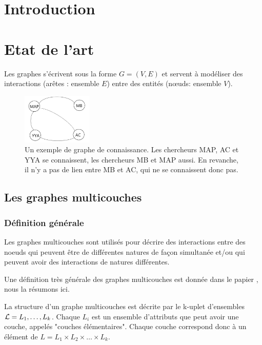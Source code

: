\documentclass[11pt,a4paper]{article}
\theoremstyle{definition}
\theoremstyle{remark}
\theoremstyle{remark}
\begin{document}
\newpage 

\tableofcontents
\newpage



\section*{Introduction}

\section{Etat de l'art}
\indent

Les graphes s'écrivent sous la forme $G=(V,E)$ et servent à modéliser des interactions (arêtes : ensemble $E$) entre des entités (nœuds: ensemble $V$). 

\begin{figure}[H]
	\centering
	\includegraphics[width=0.3\textwidth]{exGraphe.JPG}
	\caption{Un exemple de graphe de connaissance. Les chercheurs MAP, AC et YYA se connaissent, les chercheurs MB et MAP aussi. En revanche, il n'y a pas de lien entre MB et AC, qui ne se connaissent donc pas.}
\end{figure}

\subsection{Les graphes multicouches}

\subsubsection{Définition générale}

 Les graphes multicouches sont utilisés pour décrire des interactions entre des noeuds qui peuvent être de différentes natures de façon simultanée et/ou qui peuvent avoir des interactions de natures différentes. 
 
 Une définition très générale des graphes multicouches est donnée dans le papier \cite{mlkiv}, nous la résumons ici.
 
 La structure d'un graphe multicouches est décrite par le k-uplet d'ensembles ${\cal L} = L_1, \dots , L_k$. Chaque $L_i$ est un ensemble d'attributs que peut avoir une couche, appelés "couches élémentaires". Chaque couche correspond donc à un élément de $L=L_1\times L_2 \times \dots \times L_k$.
 
\end{document}
